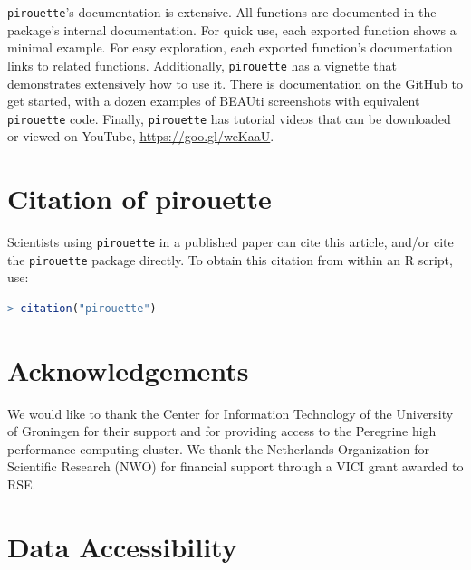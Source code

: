 \documentclass{article}
\begin{document}
\verb;pirouette;'s documentation is extensive. All functions are documented
in the package's internal documentation. For quick use, 
each exported function shows a minimal example. 
For easy exploration, each exported function's documentation links to related functions.
Additionally, \verb;pirouette; has a vignette that demonstrates extensively how
to use it. There is documentation on the GitHub to get started, 
with a dozen examples of BEAUti screenshots with equivalent \verb;pirouette; code.
Finally, \verb;pirouette; has tutorial videos that can 
be downloaded or viewed on YouTube, \url{https://goo.gl/weKaaU}.

\section{Citation of pirouette}

Scientists using \verb;pirouette; in a published paper can cite this
article, and/or cite the \verb;pirouette; package 
directly. To obtain this citation from within an R script, use:

\begin{lstlisting}[language=R]
> citation("pirouette")
\end{lstlisting}

\section{Acknowledgements}

We would like to thank the Center for Information Technology of the University 
of Groningen for their support and for providing access to the Peregrine 
high performance computing cluster. 
We thank the Netherlands 
Organization for Scientific Research (NWO) for financial support 
through a VICI grant awarded to RSE.

\section{Data Accessibility}
\end{document}
